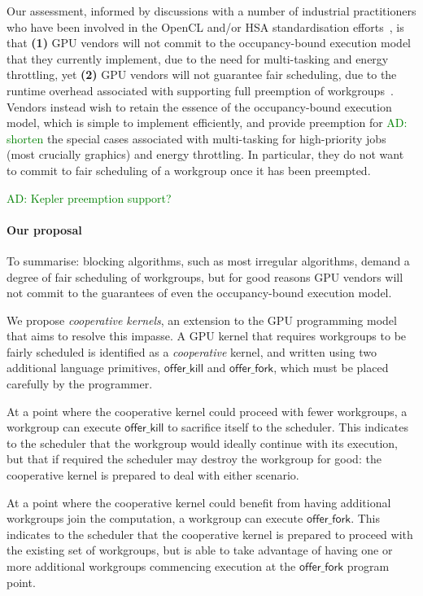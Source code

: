 \documentclass[nocopyrightspace]{sigplanconf-pldi16}
\newcommand{\ADComment}[1]{\textcolor{green}{AD: #1}}
\newcommand{\offerfork}{\mathsf{offer\_fork}}
\newcommand{\offerkill}{\mathsf{offer\_kill}}
\begin{document}
Our assessment, informed by discussions with a number of industrial
practitioners who have been involved in the OpenCL and/or HSA
standardisation efforts~\cite{CitePersonalCommunication}, is that
\textbf{(1)} GPU vendors will not commit to the occupancy-bound
execution model that they currently implement, due to the need for
multi-tasking and energy throttling, yet \textbf{(2)} GPU vendors will
not guarantee fair scheduling, due to the runtime overhead associated
with supporting full preemption of workgroups~\cite{ISCAPAPER}.  Vendors instead wish to retain the essence of the
occupancy-bound execution model, which is simple to implement
efficiently, and provide preemption for \ADComment{shorten} the special cases associated
with multi-tasking for high-priority jobs (most crucially graphics)
and energy throttling.  In particular, they do not want to commit to
fair scheduling of a workgroup once it has been preempted.

\ADComment{Kepler preemption support?}

\paragraph{Our proposal}
%
To summarise: blocking algorithms, such as most irregular algorithms,
demand a degree of fair scheduling of workgroups, but for good reasons
GPU vendors will not commit to the guarantees of even the
occupancy-bound execution model.

We propose \emph{cooperative kernels}, an extension to the GPU
programming model that aims to resolve this impasse.  A GPU kernel
that requires workgroups to be fairly scheduled is identified as a
\emph{cooperative} kernel, and written using two additional language
primitives, $\offerkill$ and $\offerfork$, which must be placed
carefully by the programmer.

At a point where the cooperative kernel could proceed with fewer
workgroups, a workgroup can execute $\offerkill$ to sacrifice itself to
the scheduler.  This indicates to the scheduler that the workgroup
would ideally continue with its execution, but that if required the
scheduler may destroy the workgroup for good: the cooperative kernel
is prepared to deal with either scenario.

At a point where the cooperative kernel could benefit from having
additional workgroups join the computation, a workgroup can execute
$\offerfork$.  This indicates to the scheduler that the cooperative
kernel is prepared to proceed with the existing set of workgroups, but
is able to take advantage of having one or more additional workgroups
commencing execution at the $\offerfork$ program point.
\end{document}
